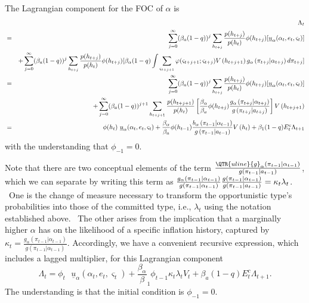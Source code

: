 \documentclass[12pt,letter,leqno]{article}
\theoremstyle{asn}
\theoremstyle{lem}
\theoremstyle{slem}
\theoremstyle{prop}
\theoremstyle{appprop}
\theoremstyle{rem}
\theoremstyle{defn}
\begin{document}
\begin{oldversion}
The Lagrangian component for the FOC of $\alpha $ is%
\begin{eqnarray*}
&&\Lambda _{t} \\
&=&\sum_{j=0}^{\infty }(\beta_{a}(1-q))^{j}\sum_{h_{t+j}}\frac{p(h_{t+j})}{%
p(h_{t})}\phi (h_{t+j})[\underline{u}_{\alpha }(\alpha _{t},e_{t},\varsigma
_{t})] \\
&&+\sum_{j=0}^{\infty }(\beta_{a}(1-q))^{j}\sum_{h_{t+j}}\frac{p(h_{t+j})}{%
p(h_{t})}\phi (h_{t+j})[\beta_{\alpha}(1-q)\int \sum_{\varsigma
_{t+j+1}}\varphi (\varsigma _{t+j+1};\varsigma _{t+j})V\left(
h_{t+j+1}\right) g_{\alpha }\left( \pi _{t+j}|\alpha
_{t+j}\right) d\pi _{t+j}] \\
&=&\sum_{j=0}^{\infty }(\beta_{a}(1-q))^{j}\sum_{h_{t+j}}\frac{p(h_{t+j})}{%
p(h_{t})}\phi (h_{t+j})[\underline{u}_{\alpha }(\alpha _{t},e_{t},\varsigma
_{t})] \\
&&+\sum_{j=0}^{\infty }(\beta_{a}(1-q))^{j+1}\sum_{h_{t+j+1}}\frac{%
p(h_{t+j+1})}{p(h_{t})}\left[ \frac{\beta_{\alpha}}{\beta_{a}}\phi
(h_{t+j})\frac{g_{\alpha }\left( \pi _{t+j}|\alpha
_{t+j}\right) }{g\left( \pi _{t+j}|a_{t+j}\right) }\right] V%
\left( h_{t+j+1}\right) \\
&=&\phi (h_{t})\text{ }\underline{u}_{\alpha }(\alpha _{t},e_{t},\varsigma
_{t})+\frac{\beta_{\alpha}}{\beta_{a}}\phi (h_{t-1})%
\frac{b_{\alpha }\left( \pi _{t-1}|\alpha _{t-1}\right) }{%
g\left( \pi _{t-1}|a_{t-1}\right) }V\left( h_{t}\right) +\beta
_{1}(1-q)E_{t}^{c}\Lambda _{t+1}
\end{eqnarray*}%
with the understanding that $\phi _{-1}=0$.

Note that there are two conceptual elements of the term $\frac{\QTR{uline}{g}%
_{\alpha }\left( \pi _{t-1}|\alpha _{t-1}\right) }{g\left( \pi
_{t-1}|a_{t-1}\right) }$, which we can separate by writing this term as $%
\frac{g_{\alpha }\left( \pi _{t-1}|\alpha _{t-1}\right) }{%
g\left( \pi _{t-1}|\alpha _{t-1}\right) }\frac{g\left( \pi
_{t-1}|\alpha _{t-1}\right) }{g\left( \pi _{t-1}|a_{t-1}\right) }=\kappa
_{t}\lambda _{t}$. \ One is the change of measure necessary to transform the
opportunistic type's probabilities into those of the committed type, i.e., $%
\lambda _{t}$ using the notation established above. \ The other arises from
the implication that a marginally higher $\alpha $ has on the likelihood of
a specific inflation history, captured by $\kappa _{t}=\frac{g%
_{\alpha }\left( \pi _{t-1}|\alpha _{t-1}\right) }{g\left( \pi _{t-1}|\alpha
_{t-1}\right) }$. Accordingly, we have a convenient recursive expression,
which includes a lagged multiplier, for this Lagrangian component 
\begin{equation}
\Lambda _{t}=\phi _{t}\text{ }\underline{u}_{\alpha }(\alpha
_{t},e_{t},\varsigma _{t})+\frac{\beta_{\alpha}}\beta
_{1}\phi _{t-1}\kappa _{t}\lambda _{t}V_{t}+\beta_{a}(1-q)E_{t}^{c}\Lambda
_{t+1}\text{.}  \label{OMrecursive}
\end{equation}%
The understanding is that the initial condition is $\phi _{-1}=0$.


\end{oldversion}
\end{document}
